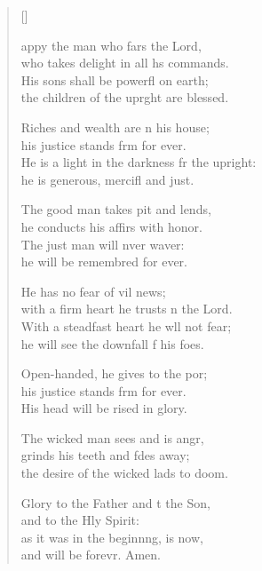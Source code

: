 \settowidth{\versewidth}{He is a light in the darkness for the upright: *}
\begin{verse}[\versewidth]
  \begin{patverse}
appy the man who fars the Lord,\Med\\
who takes delight in all h\pointup{\i}s commands.\\
His sons shall be powerfl on earth;\Med\\
the children of the upr\pointup{\i}ght are blessed.

Riches and wealth are \pointup{\i}n his house;\Med\\
his justice stands f\pointup{\i}rm for ever.\\
He is a light in the darkness fr the upright:\Med\\
he is generous, mercifl and just.

The good man takes pit and lends,\Med\\
he conducts his affirs with honor.\\
The just man will nver waver:\Med\\
he will be remembred for ever.

He has no fear of vil news;\Med\\
with a firm heart he trusts \pointup{\i}n the Lord.\\
With a steadfast heart he w\pointup{\i}ll not fear;\Med\\
he will see the downfall f his foes.

Open-handed, he gives to the por;\Flex\\
his justice stands f\pointup{\i}rm for ever.\Med\\
His head will be rised in glory.

The wicked man sees and is angr,\Flex\\
grinds his teeth and fdes away;\Med\\
the desire of the wicked lads to doom.

Glory to the Father and t the Son,\Med\\
and to the Hly Spirit:\\
as it was in the beginn\pointup{\i}ng, is now,\Med\\
and will be forevr. Amen. 
  \end{patverse}
\end{verse}
